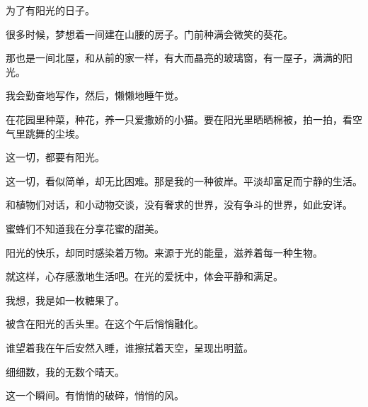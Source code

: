 \documentclass[12pt,a4paper]{article}
\begin{document}
		为了有阳光的日子。

		很多时候，梦想着一间建在山腰的房子。门前种满会微笑的葵花。\par
		那也是一间北屋，和从前的家一样，有大而晶亮的玻璃窗，有一屋子，满满的阳光。\par
		我会勤奋地写作，然后，懒懒地睡午觉。\par
		在花园里种菜，种花，养一只爱撒娇的小猫。要在阳光里晒晒棉被，拍一拍，看空气里跳舞的尘埃。\par
		这一切，都要有阳光。\par
		这一切，看似简单，却无比困难。那是我的一种彼岸。平淡却富足而宁静的生活。\par
		和植物们对话，和小动物交谈，没有奢求的世界，没有争斗的世界，如此安详。

		蜜蜂们不知道我在分享花蜜的甜美。\par
		阳光的快乐，却同时感染着万物。来源于光的能量，滋养着每一种生物。\par
		就这样，心存感激地生活吧。在光的爱抚中，体会平静和满足。\par
		我想，我是如一枚糖果了。\par
		被含在阳光的舌头里。在这个午后悄悄融化。\par
		谁望着我在午后安然入睡，谁擦拭着天空，呈现出明蓝。

		细细数，我的无数个晴天。

	\endwriting



		这一个瞬间。有悄悄的破碎，悄悄的风。
\end{document}
